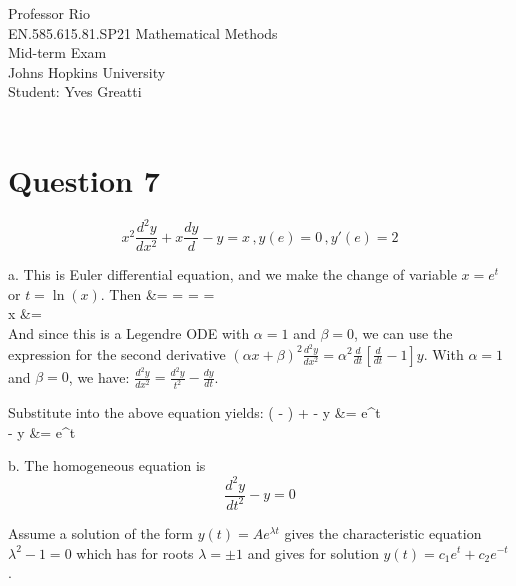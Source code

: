 \documentclass[12pt,twoside]{article}
\begin{document}
\noindent Professor Rio\\
EN.585.615.81.SP21 Mathematical Methods\\
Mid-term Exam\\
Johns Hopkins University\\
Student: Yves Greatti\\\

\section*{Question 7}
\[
	x^2 \frac{d^2 y}{dx^2} + x \frac{dy}{d} - y = x \, , y(e) = 0 \, , y'(e) = 2
\]

\be 
\item [a.]
This is Euler differential equation, and we make the change of variable $x=e^t$ or $t=\ln(x)$.
Then
\ba
	 &=   =   =    =     \\ 
	x   &=  \\
\ea
And since this is a Legendre ODE with $\alpha=1$ and $\beta=0$, we can use the expression for the second derivative 
$(\alpha x + \beta)^2 \frac{d^2y}{dx^2} = \alpha^2 \frac{d}{d t} [\frac{d}{dt} - 1] y$.
With $\alpha=1$ and $\beta=0$, we have: $ \frac{d^2y}{dx^2} =  \frac{d^2y}{ t^2} - \frac{dy}{dt}$. \\ \hfill \break

Substitute into the above equation yields:
\ba
	(  - ) +  - y &= e^t \\
	  - y &= e^t \\
\ea

\item [b.]
The homogeneous equation is
\[
	 \frac{d^2y}{dt^2} - y = 0
\]

Assume a solution of the form $y(t) = A e^{\lambda t}$ gives the characteristic equation $\lambda^2 - 1 = 0$ which has for roots $\lambda = \pm1$ and gives
for solution $y(t) = c_1 e^t + c_2 e^{-t}$.
\end{document}
